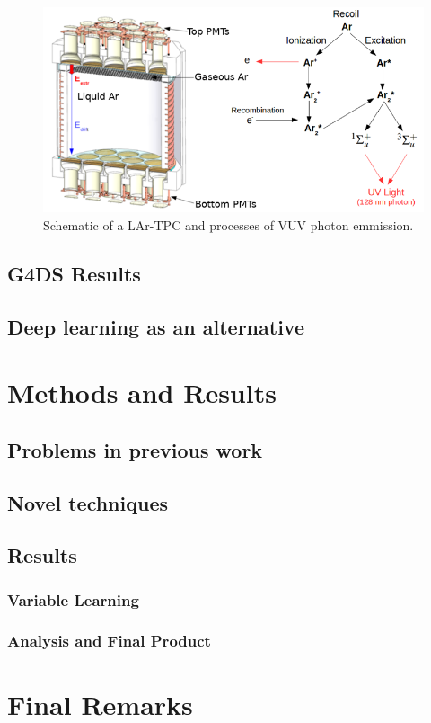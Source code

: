 \documentclass[11pt]{article} %
\begin{document}
\begin{figure}[H]
\centering
\includegraphics[scale=0.5]{images/detector.png}
\caption{\cite{edkins2017detailed} Schematic of a LAr-TPC and processes of VUV photon emmission.}
\label{fig:detector}
\end{figure}
\subsection{G4DS Results}

\subsection{Deep learning as an alternative}

\section{Methods and Results}
\subsection{Problems in previous work}

\subsection{Novel techniques}

\subsection{Results}
\subsubsection{Variable Learning}

\subsubsection{Analysis and Final Product}


\section{Final Remarks}

\newpage
\printbibliography
\end{document}
